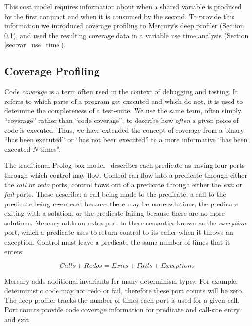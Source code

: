 This cost model requires information about when a shared variable is
produced by the first conjunct and when it is consumed by the second.
To provide this information we introduced coverage profiling to
Mercury's deep profiler (Section \ref{sec:coverage}),
and used the resulting coverage data in a variable use time analysis
(Section \ref{sec:var_use_time}).

\subsection{Coverage Profiling}
\label{sec:coverage}

Code \emph{coverage} is a term often used in the context of debugging and
testing.
It referrs to which parts of a program get executed and which do not,
it is used to determine the completeness of a test-suite.
We use the same term,
often simply ``coverage'' rather than ``code coverage'',
to describe how \emph{often} a given peice of code is executed.
Thus, we have extended the concept of coverage from a binary ``has been
executed'' or ``has not been executed'' to a more informative
``has been executed $N$ times''.

The traditional Prolog box
model~\citep{box-model} describes each predicate
as having four ports through which control may flow.
Control can flow into a predicate through either the \emph{call} or
\emph{redo} ports,
control flows out of a predicate through either the \emph{exit} or
\emph{fail} ports.
These describe:
    a call being made to the predicate,
    a call to the predicate being re-entered because there may be more
    solutions,
    the predicate exiting with a solution,
    or the predicate failing because there are no more solutions.
Mercury adds an extra port to these semantics known as the
\emph{exception} port,
which a predicate uses to return control to its caller when it throws an
exception.
Control must leave a predicate the same number of times that it enters:

\begin{equation*}
Calls + Redos = Exits + Fails + Exceptions
\end{equation*}

\noindent
Mercury adds additional invariants for many determinism types.
For example, deterministic code may not redo or fail,
therefore these port counts will be zero.
The deep profiler tracks the number of times each port is used for a given
call.
Port counts provide code coverage information for predicate and call-site
entry and exit.

